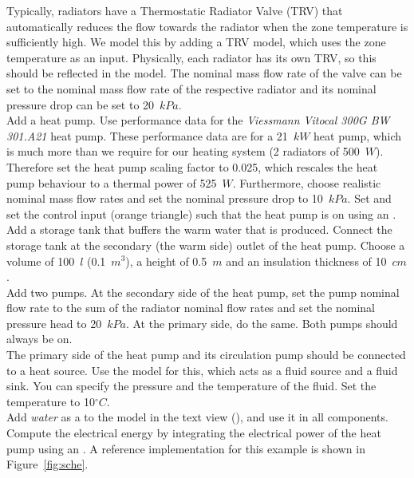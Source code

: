 \documentclass[10pt,a4paper]{article}
\begin{document}
Typically, radiators have a Thermostatic Radiator Valve (TRV)
that automatically reduces the flow towards the radiator
when the zone temperature is sufficiently high.
We model this by adding a TRV model, which uses
the zone temperature  as an input.
Physically, each radiator has its own TRV, 
so this should be reflected in the model.
The nominal mass flow rate of the valve can be set to the nominal
mass flow rate of the respective radiator and its nominal pressure drop can be set 
to 20~$kPa$.\\

Add a heat pump. 
Use performance data for the \textit{Viessmann Vitocal 300G BW 301.A21} heat pump.
These performance data are for a 21~$kW$ heat pump, 
which is much more than we require for our heating system (2 radiators of 500~$W$).
Therefore set the heat pump scaling factor to 0.025, 
which rescales the heat pump behaviour to a thermal power of 525~$W$.
Furthermore, choose realistic nominal mass flow rates and set the nominal pressure
drop to 10~$kPa$. Set  and set the control input (orange triangle)
such that the heat pump is on using an .\\

Add a storage tank that buffers the warm water that is produced.
Connect the storage tank at the secondary (the warm side) outlet of the heat pump.
Choose a volume of 100~$l$ (0.1~$m^3$), a height of 0.5~$m$ and an insulation thickness of 10~$cm$.\\

Add two pumps.
At the secondary side of the heat pump, 
set the pump nominal flow rate to the sum of the radiator nominal flow rates
and set the nominal pressure head to 20~$kPa$.
At the primary side, do the same.
Both pumps should always be on.\\

The primary side of the heat pump and its circulation pump should be connected
to a heat source. Use the model  for this,
which acts as a fluid source and a fluid sink. You can specify the pressure
and the temperature of the fluid. Set the temperature to 10$^{\circ}C$.\\

Add \textit{water} as a  to the model 
in the text view (), and use it in all components. Compute the electrical energy by integrating the electrical power of the heat pump
using an . A reference implementation for this example is shown in Figure~\ref{fig:sche}.
\end{document}
